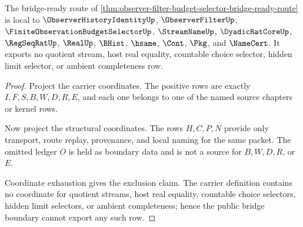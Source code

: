 \begin{theorem}
\label{thm:observer-filter-budget-selector-locality-bridge-boundary}
The bridge-ready route of \autoref{thm:observer-filter-budget-selector-bridge-ready-route} is local to $\ObserverHistoryIdentityUp$, $\ObserverFilterUp$, $\FiniteObservationBudgetSelectorUp$, $\StreamNameUp$, $\DyadicRatCoreUp$, $\RegSeqRatUp$, $\RealUp$, $\BHist$, $\hsame$, $\Cont$, $\Pkg$, and $\NameCert$. It exports no quotient stream, host real equality, countable choice selector, hidden limit selector, or ambient completeness row.
\end{theorem}
\begin{proof}
Project the carrier coordinates. The positive rows are exactly $I,F,S,B,W,D,R,E$, and each one belongs to one of the named source chapters or kernel rows.

Now project the structural coordinates. The rows $H,C,P,N$ provide only transport, route replay, provenance, and local naming for the same packet. The omitted ledger $O$ is held as boundary data and is not a source for $B,W,D,R$, or $E$.

Coordinate exhaustion gives the exclusion claim. The carrier definition contains no coordinate for quotient streams, host real equality, countable choice selectors, hidden limit selectors, or ambient completeness; hence the public bridge boundary cannot export any such row.
\end{proof}

